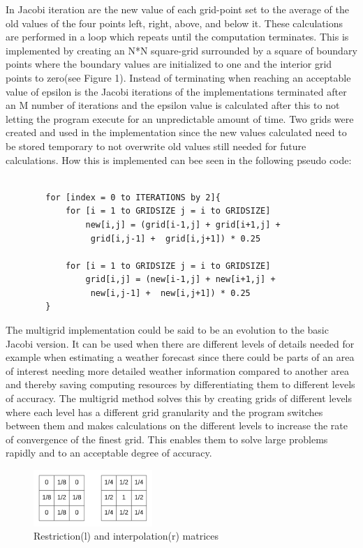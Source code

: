 \documentclass{article}
\begin{document}
In Jacobi iteration are the new value of each grid-point set to the average of the old values of the four points left, right, above, and below it. These calculations are performed in a loop which repeats until the computation terminates. This is implemented by creating an N*N square-grid surrounded by a square of boundary points where the boundary values are initialized to one and the interior grid points to zero(see Figure 1). Instead of terminating when reaching an acceptable value of epsilon is the Jacobi iterations of the implementations terminated after an M number of iterations and the epsilon value is calculated after this to not letting the program execute for an unpredictable amount of time. Two grids were created and used in the implementation since the new values calculated need to be stored temporary to not overwrite old values still needed for future calculations. How this is implemented can bee seen in the following pseudo code:


\begin{verbatim}

        for [index = 0 to ITERATIONS by 2]{
            for [i = 1 to GRIDSIZE j = i to GRIDSIZE]
                new[i,j] = (grid[i-1,j] + grid[i+1,j] +
                 grid[i,j-1] +  grid[i,j+1]) * 0.25
	
            for [i = 1 to GRIDSIZE j = i to GRIDSIZE]
                grid[i,j] = (new[i-1,j] + new[i+1,j] + 
                 new[i,j-1] +  new[i,j+1]) * 0.25
        }

\end{verbatim}


The multigrid implementation could be said to be an evolution to the basic Jacobi version. It can be used when there are different levels of details needed for example when estimating a weather forecast since there could be parts of an area of interest needing more detailed weather information compared to another area and thereby saving computing resources by differentiating them to different levels of accuracy. The multigrid method solves this by creating grids of different levels where each level has a different grid granularity and the program switches between them and makes calculations on the different levels to increase the rate of convergence of the finest grid. This enables them to solve large problems rapidly and to an acceptable degree of accuracy.

\begin{figure}
    \includegraphics[width=0.4\textwidth]{../images/lvloperations.png}
    \caption{Restriction(l) and interpolation(r) matrices}
    \label{fig:basic}
\end{figure}
\end{document}
